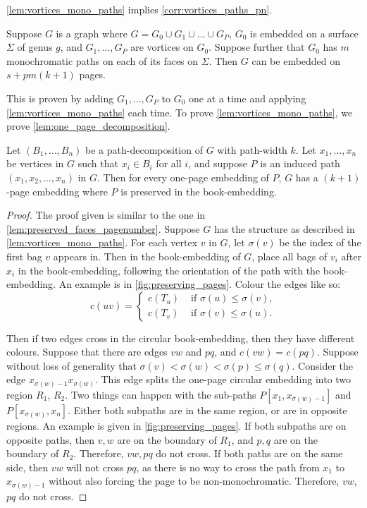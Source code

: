\cref{lem:vortices_mono_paths} implies \cref{corr:vortices_paths_pn}.

\begin{corollary}\label{corr:vortices_paths_pn}
	Suppose $G$ is a graph where $G = G_0 \cup G_1 \cup \ldots \cup G_P$, $G_0$ is embedded on a surface $\Sigma$ of genus $g$, and $G_1, \ldots ,G_P$ are vortices on $G_0$. Suppose further that $G_0$ has $m$ monochromatic paths on each of its faces on $\Sigma$. Then $G$ can be embedded on $s + pm(k+1)$ pages.
\end{corollary}

This is proven by adding $G_1, \ldots, G_P$ to $G_0$ one at a time and applying \cref{lem:vortices_mono_paths} each time. To prove \cref{lem:vortices_mono_paths}, we prove \cref{lem:one_page_decomposition}.
\begin{lemma}\label{lem:one_page_decomposition}
	Let \((B_1, \ldots, B_n)\) be a path-decomposition of \(G\) with path-width \(k\). Let \(x_1, \ldots, x_n\) be vertices in \(G\) such that \(x_i \in B_i\) for all \(i\), and suppose \(P\) is an induced path \((x_1, x_2, \ldots, x_n)\) in \(G\). Then for every one-page embedding of \(P\), \(G\) has a \((k + 1)\)-page embedding where $P$ is preserved in the book-embedding.
\end{lemma}
\begin{proof}
	The proof given is similar to the one in \cref{lem:preserved_faces_pagenumber}. 
	Suppose \(G\) has the structure as described in \cref{lem:vortices_mono_paths}. For each vertex \(v\) in \(G\), let \(\sigma(v)\) be the index of the first bag \(v\) appears in. Then in the book-embedding of \(G\), place all bags of \(v_i\) after \(x_i\) in the book-embedding, following the orientation of the path with the book-embedding. An example is in \cref{fig:preserving_pages}. Colour the edges like so:
	\begin{equation}
		c(uv) =
		\begin{cases}
			c(T_u) & \text{ if } \sigma(u) \leq \sigma(v), \\
			c(T_v) & \text{ if } \sigma(v) \leq \sigma(u).
		\end{cases}
	\end{equation}

	Then if two edges cross in the circular book-embedding, then they have different colours. Suppose that there are edges $vw$ and $pq$, and $c(vw) = c(pq)$.  Suppose without loss of generality that $\sigma(v) < \sigma(w) < \sigma(p) \leq \sigma(q)$. Consider the edge $x_{\sigma(w)-1} x_{\sigma(w)}$. This edge splits the one-page circular embedding into two region $R_1$, $R_2$. Two things can happen with the sub-paths $P[x_1,x_{\sigma(w) - 1}]$ and $P[x_{\sigma(w)}, x_n]$. Either both subpaths are in the same region, or are in opposite regions. An example is given in \cref{fig:preserving_pages}. If both subpaths are on opposite paths, then $v,w$ are on the boundary of $R_1$, and $p, q$ are on the boundary of $R_2$. Therefore, $vw, pq$ do not cross. If both paths are on the same side, then $vw$ will not cross $pq$, as there is no way to cross the path from $x_1$ to $x_{\sigma(w) - 1}$ without also forcing the page to be non-monochromatic. Therefore, $vw$, $pq$ do not cross. 
\end{proof}


